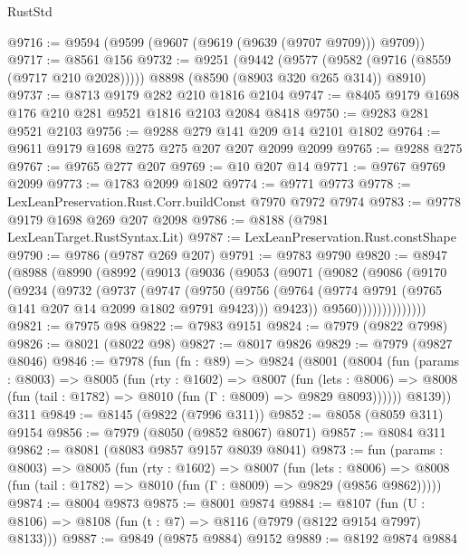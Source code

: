 \begin{lexlean}{RustStd}
\begin{coremodule}
@9716 := @9594 (@9599 (@9607 (@9619 (@9639 (@9707 @9709))) @9709))
@9717 := @8561 @156
@9732 := @9251
    (@9442
      (@9577 (@9582 (@9716 (@8559 (@9717 @210 @2028)))))
      @8898
      (@8590 (@8903 @320 @265 @314))
      @8910)
@9737 := @8713 @9179 @282 @210 @1816 @2104
@9747 := @8405 @9179 @1698 @176 @210 @281 @9521 @1816 @2103 @2084 @8418
@9750 := @9283 @281 @9521 @2103
@9756 := @9288 @279 @141 @209 @14 @2101 @1802
@9764 := @9611 @9179 @1698 @275 @275 @207 @207 @2099 @2099
@9765 := @9288 @275
@9767 := @9765 @277 @207
@9769 := @10 @207 @14
@9771 := @9767 @9769 @2099
@9773 := @1783 @2099 @1802
@9774 := @9771 @9773
@9778 := LexLeanPreservation.Rust.Corr.buildConst @7970 @7972 @7974
@9783 := @9778 @9179 @1698 @269 @207 @2098
@9786 := @8188 (@7981 LexLeanTarget.RustSyntax.Lit)
@9787 := LexLeanPreservation.Rust.constShape
@9790 := @9786 (@9787 @269 @207)
@9791 := @9783 @9790
@9820 := @8947
    (@8988
      (@8990
        (@8992
          (@9013
            (@9036
              (@9053
                (@9071
                  (@9082
                    (@9086
                      (@9170
                        (@9234
                          (@9732
                            (@9737
                              (@9747
                                (@9750
                                  (@9756
                                    (@9764
                                      (@9774 @9791 (@9765 @141 @207 @14 @2099 @1802 @9791 @9423)))
                                    @9423))
                                @9560))))))))))))))
@9821 := @7975 @98
@9822 := @7983 @9151
@9824 := @7979 (@9822 @7998)
@9826 := @8021 (@8022 @98)
@9827 := @8017 @9826
@9829 := @7979 (@9827 @8046)
@9846 := @7978
    (fun (fn : @89) =>
    @9824
      (@8001
        (@8004
          (fun (params : @8003) =>
          @8005
            (fun (rty : @1602) =>
            @8007
              (fun (lets : @8006) =>
              @8008 (fun (tail : @1782) => @8010 (fun (Γ : @8009) => @9829 @8093))))))
        @8139))
    @311
@9849 := @8145 (@9822 (@7996 @311))
@9852 := @8058 (@8059 @311) @9154
@9856 := @7979 (@8050 (@9852 @8067) @8071)
@9857 := @8084 @311
@9862 := @8081 (@8083 @9857 @9157 @8039 @8041)
@9873 := fun (params : @8003) =>
  @8005
    (fun (rty : @1602) =>
    @8007
      (fun (lets : @8006) =>
      @8008 (fun (tail : @1782) => @8010 (fun (Γ : @8009) => @9829 (@9856 @9862)))))
@9874 := @8004 @9873
@9875 := @8001 @9874
@9884 := @8107 (fun (U : @8106) => @8108 (fun (t : @7) => @8116 (@7979 (@8122 @9154 @7997) @8133)))
@9887 := @9849 (@9875 @9884) @9152
@9889 := @8192 @9874 @9884

\end{coremodule}
\end{lexlean}
